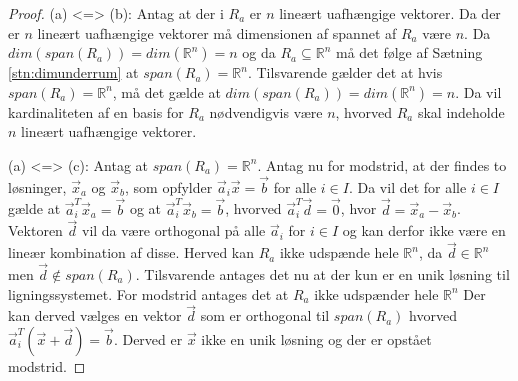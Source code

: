 \begin{proof}
	(a) <=> (b): Antag at der i $R_a$ er $n$ lineært uafhængige vektorer. Da der er $n$ lineært uafhængige vektorer må dimensionen af spannet af $R_a$ være $n$. Da $dim(span(R_a))=dim(\mathds{R}^n)=n$ og da $R_a \subseteq \mathds{R}^n$ må det følge af Sætning \ref{stn:dimunderrum} at $span(R_a)=\mathds{R}^n$. Tilsvarende gælder det at hvis $span(R_a)=\mathds{R}^n$, må det gælde at $dim(span(R_a))=dim(\mathds{R}^n)=n$. Da vil kardinaliteten af en basis for $R_a$ nødvendigvis være $n$, hvorved $R_a$ skal indeholde $n$ lineært uafhængige vektorer.


(a) <=> (c): Antag at $span(R_a)=\mathds{R}^n$. Antag nu for modstrid, at der findes to løsninger, $\vec{x}_a$ og $\vec{x}_b$, som opfylder $\vec{a}_i\vec{x}=\vec{b}$ for alle $i \in I$. 
Da vil det for alle $i \in I$ gælde at $\vec{a}_i^T\vec{x}_a=\vec{b}$ og at $\vec{a}_i^T\vec{x}_b=\vec{b}$, hvorved $\vec{a}_i^T\vec{d}=\vec{0}$, hvor $\vec{d}=\vec{x}_a-\vec{x}_b$. 
Vektoren $\vec{d}$ vil da være orthogonal på alle $\vec{a}_i$ for $i \in I$ og kan derfor ikke være en lineær kombination af disse. Herved kan $R_a$ ikke udspænde hele $\mathds{R}^n$, da $\vec{d} \in \mathds{R}^n$ men $\vec{d} \notin span(R_a)$.
Tilsvarende antages det nu at der kun er en unik løsning til ligningssystemet. For modstrid antages det at $R_a$ ikke udspænder hele $\mathds{R}^n$ Der kan derved vælges en vektor $\vec{d}$ som er orthogonal til $span(R_a)$ hvorved $\vec{a}_i^T(\vec{x}+\vec{d})=\vec{b}$. Derved er $\vec{x}$ ikke en unik løsning og der er opstået modstrid.
\end{proof}
	
	
	



